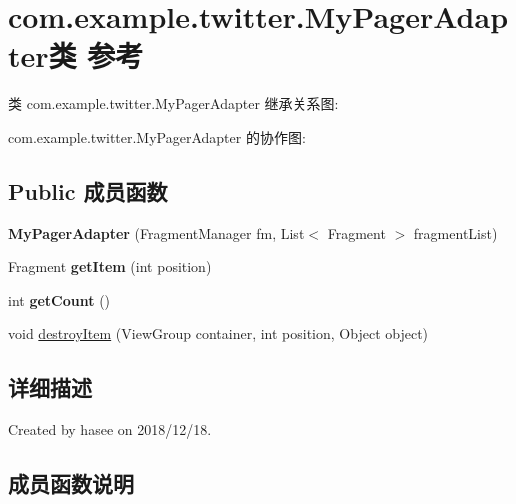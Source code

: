 \hypertarget{classcom_1_1example_1_1twitter_1_1_my_pager_adapter}{}\section{com.\+example.\+twitter.\+My\+Pager\+Adapter类 参考}
\label{classcom_1_1example_1_1twitter_1_1_my_pager_adapter}


类 com.\+example.\+twitter.\+My\+Pager\+Adapter 继承关系图\+:


com.\+example.\+twitter.\+My\+Pager\+Adapter 的协作图\+:
\subsection*{Public 成员函数}
\begin{DoxyCompactItemize}
\item 
\mbox{\label{classcom_1_1example_1_1twitter_1_1_my_pager_adapter_ad6c5205bdd8d4dabe34080c7225af524}} 
{\bfseries My\+Pager\+Adapter} (Fragment\+Manager fm, List$<$ Fragment $>$ fragment\+List)
\item 
\mbox{\label{classcom_1_1example_1_1twitter_1_1_my_pager_adapter_acfe13b498be2917e4931674db7622b7d}} 
Fragment {\bfseries get\+Item} (int position)
\item 
\mbox{\label{classcom_1_1example_1_1twitter_1_1_my_pager_adapter_a67d9ce4c74903f6507f4e889c6651dd8}} 
int {\bfseries get\+Count} ()
\item 
void \mbox{\hyperlink{classcom_1_1example_1_1twitter_1_1_my_pager_adapter_a3a91d460b08d4216457e7f777fa45e13}{destroy\+Item}} (View\+Group container, int position, Object object)
\end{DoxyCompactItemize}


\subsection{详细描述}
Created by hasee on 2018/12/18. 

\subsection{成员函数说明}
\mbox{\label{classcom_1_1example_1_1twitter_1_1_my_pager_adapter_a3a91d460b08d4216457e7f777fa45e13}} 
